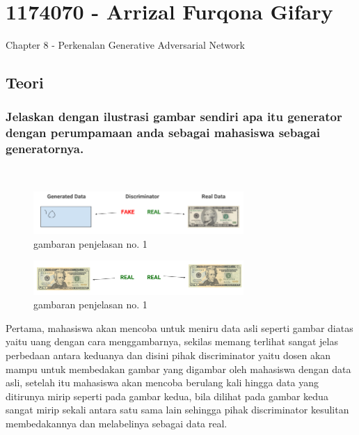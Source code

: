 \section{1174070 - Arrizal Furqona Gifary}
Chapter 8 - Perkenalan Generative Adversarial Network
\subsection{Teori}
\subsubsection{Jelaskan dengan ilustrasi gambar sendiri apa itu generator dengan perumpamaan anda sebagai mahasiswa sebagai generatornya.}
\hfill\\
\begin{figure}[H]
	\centering
	\includegraphics[width=8cm]{figures/1174070/8/gan_diagram.png}
	\caption{gambaran penjelasan no. 1}
\end{figure}
\begin{figure}[H]
	\centering
	\includegraphics[width=8cm]{figures/1174070/8/gan_diagram2.png}
	\caption{gambaran penjelasan no. 1}
\end{figure}
Pertama, mahasiswa akan mencoba untuk meniru data asli seperti gambar diatas yaitu uang dengan cara menggambarnya, sekilas memang terlihat sangat jelas perbedaan antara keduanya dan disini pihak discriminator yaitu dosen akan mampu untuk membedakan gambar yang digambar oleh mahasiswa dengan data asli, setelah itu mahasiswa akan mencoba berulang kali hingga data yang ditirunya mirip seperti pada gambar kedua, bila dilihat pada gambar kedua sangat mirip sekali antara satu sama lain sehingga pihak discriminator kesulitan membedakannya dan melabelinya sebagai data real.

